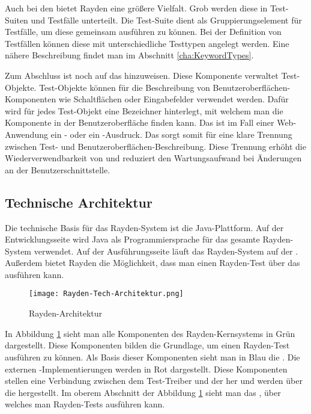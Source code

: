 \SuperPar
Auch bei den  bietet Rayden eine größere Vielfalt. Grob werden diese in Test-Suiten und Testfälle unterteilt. Die Test-Suite dient als Gruppierungselement für Testfälle, um diese gemeinsam ausführen zu können. Bei der Definition von Testfällen können diese mit unterschiedliche Testtypen angelegt werden. Eine nähere Beschreibung findet man im Abschnitt \ref{cha:KeywordTypes}.

\SuperPar
Zum Abschluss ist noch auf das  hinzuweisen. Diese Komponente verwaltet Test-Objekte. Test-Objekte können für die Beschreibung von Benutzeroberflächen-Komponenten wie Schaltflächen oder Eingabefelder verwendet werden. Dafür wird für jedes Test-Objekt eine Bezeichner hinterlegt, mit welchem man die Komponente in der Benutzeroberfläche finden kann. Das ist im Fall einer Web-Anwendung ein - oder ein -Ausdruck. Das  sorgt somit für eine klare Trennung zwischen Test- und Benutzeroberflächen-Beschreibung. Diese Trennung erhöht die Wiederverwendbarkeit von  und reduziert den Wartungsaufwand bei Änderungen an der Benutzerschnittstelle.

\subsection{Technische Architektur}

Die technische Basis für das Rayden-System ist die Java-Plattform. Auf der Entwicklungsseite wird Java als Programmiersprache für das gesamte Rayden-System verwendet. Auf der Ausführungsseite läuft das Rayden-System auf der . Außerdem bietet Rayden die Möglichkeit, dass man einen Rayden-Test über das \cite{JavaScriptApi} ausführen kann. 

\begin{figure}[h]
\centering
\texttt{[image: Rayden-Tech-Architektur.png]}
\caption{Rayden-Architektur}
\label{fig:rayden-tech-arch}
\end{figure}

\SuperPar
In Abbildung \ref{fig:rayden-tech-arch} sieht man alle Komponenten des Rayden-Kernsystems in Grün dargestellt. Diese Komponenten bilden die Grundlage, um einen Rayden-Test ausführen zu können. Als Basis dieser Komponenten sieht man in Blau die . Die externen -Implementierungen werden in Rot dargestellt. Diese Komponenten stellen eine Verbindung zwischen dem Test-Treiber und der  her und werden über die  hergestellt. Im oberem Abschnitt der Abbildung \ref{fig:rayden-tech-arch} sieht man das , über welches man Rayden-Tests ausführen kann.

